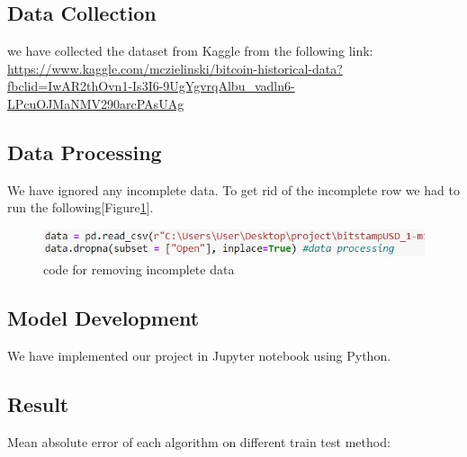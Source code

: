 \documentclass{IEEEtran}
\begin{document}
\subsection{Data Collection}
we have collected the dataset from Kaggle from the following link: \url{https://www.kaggle.com/mczielinski/bitcoin-historical-data?fbclid=IwAR2thOvn1-Is3I6-9UgYgvrqAlbu_vadln6-LPcuOJMaNMV290arcPAsUAg}
\subsection{Data Processing}
We have ignored any incomplete data. To get rid of the incomplete row we had to run the following[Figure\ref{fig_incompleteData}].

\begin{figure}
\centering
\includegraphics[width = .5\textwidth,length = .7\textlength]{Capture.JPG}
\caption{code for removing incomplete data}
\label{fig_incompleteData}
\end{figure}
\subsection{Model Development}

We have implemented our project in Jupyter notebook using Python.
\subsection{Result}
Mean absolute error of each algorithm on different train test method: \\
\\
\end{document}
